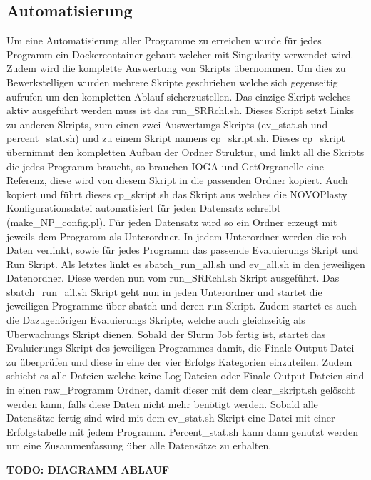 \documentclass{scrartcl}
\begin{document}
\subsection{Automatisierung}
\label{sec-3-1}
Um eine Automatisierung aller Programme zu erreichen wurde für jedes Programm ein Dockercontainer gebaut welcher mit Singularity verwendet wird. Zudem wird die komplette Auswertung von Skripts 
übernommen. Um dies zu Bewerkstelligen wurden mehrere Skripte geschrieben welche sich gegenseitig aufrufen um den kompletten Ablauf sicherzustellen. 
Das einzige Skript welches aktiv ausgeführt werden muss ist das run\_SRRchl.sh. Dieses Skript setzt Links zu anderen Skripts, zum einen zwei Auswertungs Skripts (ev\_stat.sh und percent\_stat.sh) und
zu einem Skript namens cp\_skript.sh. Dieses cp\_skript übernimmt den kompletten Aufbau der Ordner Struktur, und linkt all die Skripts die jedes Programm braucht, so brauchen IOGA und GetOrgranelle
eine Referenz, diese wird von diesem Skript in die passenden Ordner kopiert. Auch kopiert und führt dieses cp\_skript.sh das Skript aus welches die NOVOPlasty Konfigurationsdatei automatisiert für jeden
Datensatz schreibt (make\_NP\_config.pl). Für jeden Datensatz wird so ein Ordner erzeugt mit jeweils dem Programm als Unterordner. In jedem Unterordner werden die roh Daten verlinkt, sowie für jedes Programm
das passende Evaluierungs Skript und Run Skript. Als letztes linkt es sbatch\_run\_all.sh und ev\_all.sh in den jeweiligen Datenordner. Diese werden nun vom run\_SRRchl.sh Skript ausgeführt. Das sbatch\_run\_all.sh
Skript geht nun in jeden Unterordner und startet die jeweiligen Programme über sbatch und deren run Skript. Zudem startet es auch die Dazugehörigen Evaluierungs Skripte, welche auch gleichzeitig als Überwachungs
Skript dienen. Sobald der Slurm Job fertig ist, startet das Evaluierungs Skript des jeweiligen Programmes damit, die Finale Output Datei zu überprüfen und diese in eine der vier Erfolgs Kategorien einzuteilen. Zudem
schiebt es alle Dateien welche keine Log Dateien oder Finale Output Dateien sind in einen raw\_Programm Ordner, damit dieser mit dem clear\_skript.sh gelöscht werden kann, falls diese Daten nicht mehr benötigt werden.
Sobald alle Datensätze fertig sind wird mit dem ev\_stat.sh Skript eine Datei mit einer Erfolgstabelle mit jedem Programm. Percent\_stat.sh kann dann genutzt werden um eine Zusammenfassung über alle Datensätze zu erhalten.


\textbf{TODO: DIAGRAMM ABLAUF}
\end{document}
